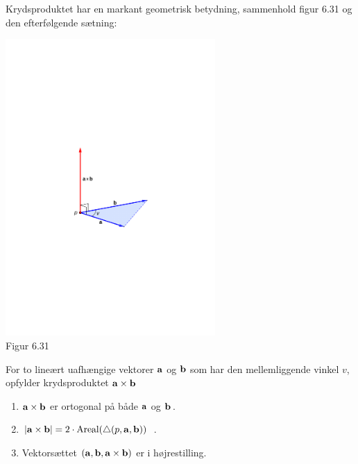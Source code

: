 Krydsproduktet har en markant geometrisk betydning, sammenhold figur 6.31 og den efterfølgende sætning:
\begin{center}
		\includegraphics[trim=1.4cm 10.5cm 1.4cm 10.7cm,width=0.60\textwidth,clip]{geometer/krydsprodukt.pdf}	
		\\Figur 6.31
\end{center} 
\begin{theorem}\label{tn6.ArTrekant3d}
For to lineært uafhængige vektorer $\mathbf{a}$ og $\mathbf{b}$ som har den  mellemliggende vinkel $v$, opfylder krydsproduktet $\mathbf{a}\times\mathbf{b}$
\begin{enumerate}
\item
$\mathbf{a}\times\mathbf{b}$ er ortogonal på både $\mathbf{a}$ og $\mathbf{b}$\,.
\item
$|\mathbf{a}\times\mathbf{b}| = 2\cdot\operatorname{Areal}(\bigtriangleup(p, \mathbf{a}, \mathbf{b}))$
\,. 
\item
Vektorsættet $(\mathbf{a},\mathbf{b},\mathbf{a}\times\mathbf{b})$ er i højrestilling.
\end{enumerate}
\end{theorem}


